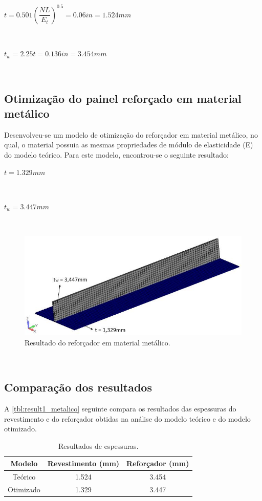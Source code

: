 \centerline{$t = 0.501({\dfrac{NL}{E_t}})^{0.5} = 0.06 in = 1.524 mm$}\

\centerline{$t_w = 2.25t = 0.136in = 3.454 mm$}\


\subsection{Otimização do painel reforçado em material metálico}
Desenvolveu-se um modelo de otimização do reforçador em material metálico, no qual, o material possuia as mesmas propriedades de módulo de elasticidade (E) do modelo teórico. Para este modelo, encontrou-se o seguinte resultado:\

\centerline{$t = 1.329 mm$}\

\centerline{$t_w = 3.447 mm$}\

\begin{figure}[ht]
 \caption{\label{fig_ModelMetallic}Resultado do reforçador em material metálico.}
 \centering
 \includegraphics[scale=1.0]{figura/Model_Metallic1}
\end{figure}
\

\subsection{Comparação dos resultados}
A \autoref{tbl:result1_metalico} seguinte compara os resultados das espessuras do revestimento e do reforçador obtidas na análise do modelo teórico e do modelo otimizado.
\begin{table}[h]
\centering
\begin{tabular}{ccc}
\toprule
Modelo & Revestimento (mm) & Reforçador (mm) \\\midrule
Teórico & 1.524 & 3.454\\
Otimizado & 1.329 & 3.447\\
\bottomrule
\end{tabular}
\caption{Resultados de espessuras.}
\label{tbl:result1_metalico}
\end{table}


